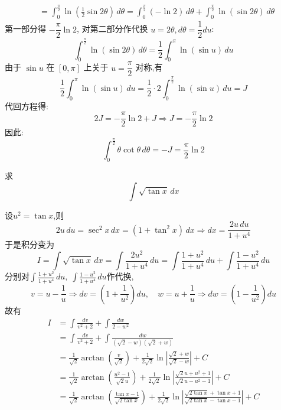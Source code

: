 \begin{questions}
\begin{solution}
\begin{align*}
        &= \int_{0}^{\frac{\pi}{2}} \ln\left( \frac{1}{2} \sin 2\theta \right) \, d\theta = \int_{0}^{\frac{\pi}{2}} (-\ln 2) \, d\theta + \int_{0}^{\frac{\pi}{2}} \ln(\sin 2\theta) \, d\theta
        \end{align*}
        第一部分得 $-\dfrac{\pi}{2} \ln 2$, 对第二部分作代换 $u = 2\theta, d\theta = \dfrac{1}{2} du$:
        \[
        \int_{0}^{\frac{\pi}{2}} \ln(\sin 2\theta) \, d\theta = \frac{1}{2} \int_{0}^{\pi} \ln(\sin u) \, du
        \]
        由于 $\sin u$ 在 $[0, \pi]$ 上关于 $u = \dfrac{\pi}{2}$ 对称,有
        \[
        \frac{1}{2} \int_{0}^{\pi} \ln(\sin u) \, du = \frac{1}{2} \cdot 2 \int_{0}^{\frac{\pi}{2}} \ln(\sin u) \, du = J
        \]
        代回方程得:
        \[
        2J = -\frac{\pi}{2} \ln 2 + J \Rightarrow J = -\frac{\pi}{2} \ln 2
        \]
        因此:
        \[
        \int_{0}^{\frac{\pi}{2}} \theta \cot \theta \, d\theta = -J = \frac{\pi}{2} \ln 2
        \]
    \end{solution}
    \question
    求
    \[
    \int \sqrt{\tan x} \, dx
    \]
    \begin{solution}
        设$u^2 = \tan x$,则
        \[
        2u \, du = \sec^2 x \, dx = (1+\tan^2 x)\,dx \Rightarrow dx = \frac{2u \, du}{1+u^4}
        \]
        于是积分变为
        \[
        I = \int \sqrt{\tan x} \, dx = \int \frac{2u^2}{1+u^4} \, du = \int \frac{1+u^2}{1+u^4} \, du + \int \frac{1-u^2}{1+u^4} \, du
        \]
        分别对$\displaystyle \int \frac{1+u^2}{1+u^4} \, du,\;\int \frac{1-u^2}{1+u^4} \, du$作代换,
        \[
        v = u - \frac{1}{u} \Rightarrow dv = \left(1+\frac{1}{u^2}\right) du, \quad w = u + \frac{1}{u} \Rightarrow dw = \left(1-\frac{1}{u^2}\right) du
        \]
        故有
        \begin{align*}
        I&= \int \frac{dv}{v^2+2} + \int \frac{dw}{2-w^2} \\
        &=\int \frac{dv}{v^2+2} + \int \frac{dw}{(\sqrt{2}-w)(\sqrt{2}+w)} \\
        &= \frac{1}{\sqrt{2}}\arctan\left(\frac{v}{\sqrt{2}}\right) + \frac{1}{2\sqrt{2}} \ln \left|\frac{\sqrt{2}+w}{\sqrt{2}-w}\right| + C \\
        &= \frac{1}{\sqrt{2}} \arctan\left(\frac{u^2-1}{\sqrt{2}u}\right) + \frac{1}{2\sqrt{2}} \ln\left|\frac{\sqrt{2} u + u^2 + 1}{\sqrt{2} u - u^2 -1}\right| + C \\
        &= \frac{1}{\sqrt{2}}\arctan\left(\frac{\tan x -1}{\sqrt{2 \tan x}}\right) + \frac{1}{2\sqrt{2}} \ln\left|\frac{\sqrt{2 \tan x} + \tan x + 1}{\sqrt{2 \tan x} - \tan x -1}\right| + C
        \end{align*}
    \end{solution}


\end{questions}
